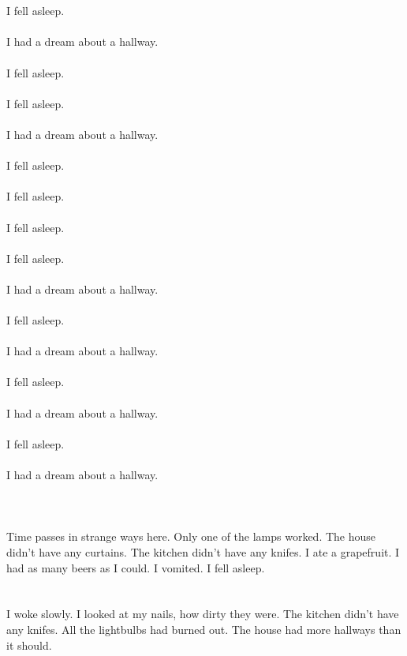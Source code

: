 \documentclass{article}
\begin{document}
    \section{}
    I fell asleep.\\\\I had a dream about a hallway.\\\\ I fell asleep.\\\\ I fell asleep.\\\\I had a dream about a hallway.\\\\ I fell asleep.\\\\ I fell asleep.\\\\ I fell asleep.\\\\ I fell asleep.\\\\I had a dream about a hallway.\\\\ I fell asleep.\\\\I had a dream about a hallway.\\\\ I fell asleep.\\\\I had a dream about a hallway.\\\\ I fell asleep.\\\\I had a dream about a hallway.\\\\ 
    \newpage
    
    \section{}
    Time passes in strange ways here. Only one of the lamps worked. The house didn't have any curtains. The kitchen didn't have any knifes. I ate a grapefruit. I had as many beers as I could. I vomited. I fell asleep.  
    \newpage
    
    \section{}
    I woke slowly. I looked at my nails, how dirty they were. The kitchen didn't have any knifes. All the lightbulbs had burned out. The house had more hallways than it should.  
    \newpage
    
\end{document}
